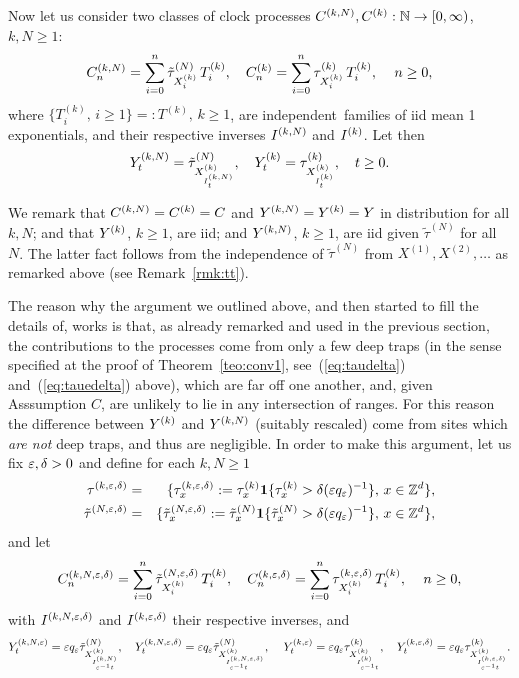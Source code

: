 Now let us consider two classes of clock processes $C^{(k,N)},C^{(k)}:{\mathbb N}\to[0,\infty)$, $k,N\geq1$:
\begin{equation}
\label{eq:cklock}
\ckn_n=\sum_{i=0}^n\tilde\tau^{(N)}_{\xk_i}\,T^{(k)}_i,\quad
\ck_n=\sum_{i=0}^n\tau^{(k)}_{\xk_i}\,T^{(k)}_i,\,\quad n\geq0,
\end{equation}
where $\{T^{(k)}_i,\,i\geq1\}=:T^{(k)},\,k\geq1$, are independent~families of iid mean 1 exponentials,
and their respective inverses $I^{(k,N)}$ and $I^{(k)}$. Let then
\begin{equation}
\label{eq:yk}
\ykn_t=\tilde\tau^{(N)}_{\xk_{\ikn_t}},\quad \yk_t=\tau^{(k)}_{\xk_{\ik_t}},\quad t\geq0.
\end{equation}

\begin{rmk}
\label{rmk:ck} 
We remark that $C^{(k,N)}=C^{(k)}=C$ and $Y^{(k,N)}=Y^{(k)}=Y$ in distribution for all $k,N$; and that $Y^{(k)}$, $k\geq1$, are iid; and 
$Y^{(k,N)}$, $k\geq1$, are iid given  $\tilde\tau^{(N)}$ for all $N$. 
The latter fact follows from the independence of
$\tilde\tau^{(N)}$ from $X^{(1)},X^{(2)},\ldots$ as remarked above (see Remark~\ref{rmk:tt}).
\end{rmk}

The reason why the argument we outlined above, and then started to fill the details of, works is that, as already remarked
and used in the previous section, the contributions to the processes come from only a few deep traps (in the sense
specified at the proof of Theorem~\ref{teo:conv1}, see~(\ref{eq:taudelta}) and~(\ref{eq:tauedelta}) above), which 
are far off one another, and, given Asssumption $C$, are unlikely to lie in any intersection of ranges. 
For this reason the difference between $Y^{(k)}$ and $Y^{(k,N)}$ 
(suitably rescaled) come from sites which {\em are not} deep traps, and thus are negligible. 
In order to make this argument, let us fix $\varepsilon,\delta>0$ and define for each $k,N\geq1$
\begin{eqnarray}
\label{eq:tked}
\tked\=\{\tked_x:=\tk_x\1\{\tk_x>\d (\eps q_\eps)^{-1}\},\,x\in\Z^d\},\\
\label{eq:ttned}
\ttned\=\{\ttned_x:=\tilde\tau^{(N)}_x\1\{\tilde\tau^{(N)}_x>\d (\eps q_\eps)^{-1}\},\,x\in\Z^d\},
\end{eqnarray}
and let
\begin{equation}
\label{eq:cked}
\ckned_n=\sum_{i=0}^n\tilde\tau^{(N,\eps,\d)}_{\xk_i}\,T^{(k)}_i,\quad\cked_n=\sum_{i=0}^n\tau^{(k,\eps,\d)}_{\xk_i}\,T^{(k)}_i,\,\quad n\geq0,
\end{equation}
with $I^{(k,N,\varepsilon,\delta)}$ and $I^{(k,\varepsilon,\delta)}$ their respective inverses, and
\begin{equation}\nn
\label{eq:yked}
\ykne_t=\eps q_\eps\tilde\tau^{(N)}_{\xk_{\ikn_{\eps^{-1}t}}},\quad \ykned_t=\eps q_\eps\tilde\tau^{(N)}_{\xk_{\ikned_{\eps^{-1}t}}},\,\quad 
\yke_t=\eps q_\eps\tau^{(k)}_{\xk_{\ik_{\eps^{-1}t}}},\quad \yked_t=\eps q_\eps\tau^{(k)}_{\xk_{\iked_{\eps^{-1}t}}}.
\end{equation}


